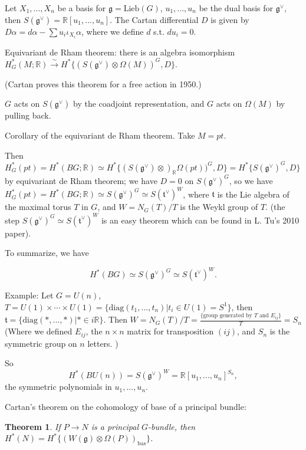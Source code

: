 \documentclass{article}
\theoremstyle{mystyle}
\newtheorem*{theorem*}{Theorem}
\theoremstyle{remark}
\numberwithin{equation}{section}
\begin{document}
Let $X_1,...,X_n$ be a basis for $\mathfrak{g} = \text{Lieb}(G)$, $u_1,...,u_n$ be the dual basis for $\mathfrak{g}^\vee$, then $S(\mathfrak{g}^\vee) = \mathbb{R}[u_1,...,u_n]$. The Cartan differential $D$ is given by 
$D\alpha = d\alpha - \sum u_i\iota_{X_i} \alpha$, where we define $d$ s.t. $du_i=0$. 


Equivariant de Rham theorem: there is an algebra isomorphism
$H^*_G(M;\mathbb{R})\xrightarrow{\sim}
H^*\{(S(\mathfrak{g}^\vee)\otimes \Omega(M))^G,D\}$. 

(Cartan proves this theorem for a free action in 1950.)

$G$ acts on $S(\mathfrak{g}^\vee)$ by the coadjoint representation, and $G$ acts on $\Omega(M)$ by pulling back.

Corollary of the equivariant de Rham theorem. Take $M = pt$.

Then $H^*_G(pt) = H^*(BG;\mathbb{R}) \simeq H^*\{(S(\mathfrak{g}^\vee)\otimes)_{\mathbb{R}} \Omega(pt))^G,D\}
= H^*\{S(\mathfrak{g}^\vee)^G,D\}$ by equivariant de Rham theorem; we have $D=0$ on $S(\mathfrak{g}^\vee)^G$, so we have
$
H^*_G(pt) = H^*(BG;\mathbb{R})  \simeq S(\mathfrak{g}^\vee)^G \simeq S(\mathfrak{t}^\vee)^W$,  where $\mathfrak{t}$ is the Lie algebra of the maximal torus $T$ in $G$, and $W = N_G(T)/T$ is the Weykl group of $T$.  (the step $S(\mathfrak{g}^\vee)^G \simeq S(\mathfrak{t}^\vee)^W$ is an easy theorem which can be found in L. Tu's 2010 paper).

To summarize, we have

$$H^*(BG) \simeq S(\mathfrak{g}^\vee)^G \simeq S(\mathfrak{t}^\vee)^W.$$

Example: Let $G = U(n)$, $T = U(1)\times \cdots \times U(1) = \{\text{diag}(t_1,...,t_n)|t_i \in U(1) = S^1\}$, then $\mathfrak{t} = \{\text{diag}(*,...,*)|*\in i\mathbb{R}\}$. Then $W = N_G(T)/T = \frac{
\{\text{group generated by }T\text{ and }E_{ij}\}}{T} = S_n$ (Where we defined $E_{ij}$, the $n\times n$ matrix for transposition $(ij)$, and $S_n$ is the symmetric group on $n$ letters. )

So 
$$H^*(BU(n))  = S(\mathfrak{g}^\vee)^W = \mathbb{R}[u_1,...,u_n]^{S_n},$$
the symmetric polynomials in $u_1,...,u_n$. 

Cartan's theorem on the cohomology of base of a principal bundle:

\begin{theorem*}If $P\rightarrow N$ is a principal $G$-bundle, then $H^*(N) = H^*\{(W(\mathfrak{g})\otimes \Omega(P))_{\text{bas}}\}$.
\end{theorem*}
\end{document}
